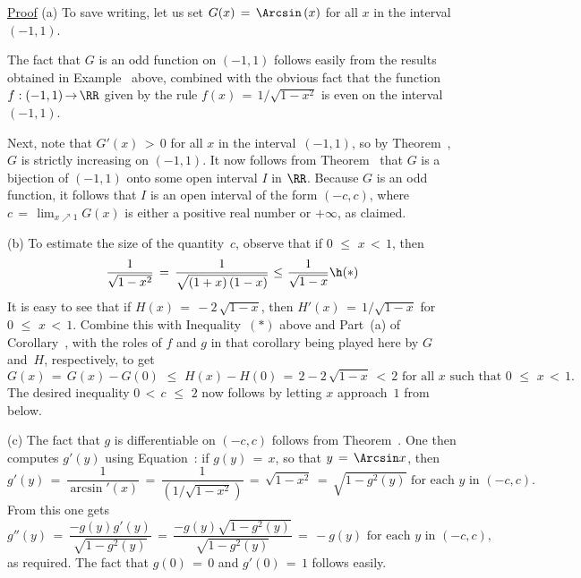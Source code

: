  

\V

        \underline{Proof} (a) To save writing, let us set $G(x) \,=\, {\Arcsin}\,(x)$ for all $x$ in the interval~$(-1,1)$.

        The fact that $G$ is an odd function on $(-1,1)$ follows easily from the results obtained in Example~ above,
    combined with the obvious fact that the function $f:(-1,1) \,{\rightarrow}\, {\RR}$
    given by the rule $f(x) \,=\, 1/\sqrt{1-x^{2}}$ is even on the interval~$(-1,1)$.

    Next, note that $G'(x)\,>\,0$ for all $x$ in the interval~$(-1,1)$, so by Theorem~, $G$ is strictly increasing on $(-1,1)$.
    It now follows from Theorem~ that $G$ is a bijection of $(-1,1)$ onto some open interval $I$ in ${\RR}$.
    Because $G$ is an odd function, it follows that $I$ is an open interval of the form $(-c,c)$,
    where $c \,=\, \lim_{x {\nearrow}1} G(x)$ is either a positive real number or $+{\infty}$, as claimed.

\V

        (b) To estimate the size of the quantity~$c$, observe that if $0\,\,{\leq}\,\,x\,<\,1$, then
        \begin{displaymath}
        \frac{1}{\sqrt{1-x^{2}}} \,=\, \frac{1}{\sqrt{(1+x)\,(1-x)}}\,\,{\leq}\,\,\frac{1}{\sqrt{1-x}} \h ({\ast})
        \end{displaymath}
    It is easy to see that if $H(x) \,=\, -2\,\sqrt{1-x}$, then $H'(x) \,=\, 1/\sqrt{1-x}$ for $0\,\,{\leq}\,\,x\,<\,1$.
    Combine this with Inequality~$({\ast})$ above and Part~(a) of Corollary~,
    with the roles of $f$ and $g$ in that corollary being played here by $G$ and~$H$, respectively, to get
        \begin{displaymath}
        G(x) \,=\, G(x) - G(0)\,\,{\leq}\,\,H(x) - H(0) \,=\, 2 - 2\,\sqrt{1-x}\,<\,2 \mbox{ for all $x$ such that $0\,\,{\leq}\,\,x\,<\,1$}.
        \end{displaymath}
    The desired inequality $0\,<\,c\,\,{\leq}\,\,2$ now follows by letting $x$ approach~$1$ from below.

\V

        (c) The fact that $g$ is differentiable on $(-c,c)$ follows from Theorem~.
    One then computes $g'(y)$ using Equation~: if $g(y) \,=\, x$, so that $y \,=\, {\Arcsin}x$, then
        \begin{displaymath}
        g'(y) \,=\, \frac{1}{{\arcsin}'(x)} \,=\, \frac{1}{(1/\sqrt{1-x^{2}})}
     \,=\, \sqrt{1-x^{2}} \,=\, \sqrt{1-g^{2}(y)} \mbox{ for each $y$ in $(-c, c)$}.
        \end{displaymath}
    From this one gets
        \begin{displaymath}
        g''(y) \,=\, \frac{-g(y)g'(y)}{\sqrt{1-g^{2}(y)}} \,=\, \frac{-g(y)\sqrt{1-g^{2}(y)}}{\sqrt{1-g^{2}(y)}} \,=\, -g(y) \mbox{ for each $y$ in $(-c,c)$},
        \end{displaymath}
    as required. The fact that $g(0) \,=\, 0$ and $g'(0) \,=\, 1$ follows easily. \Q

